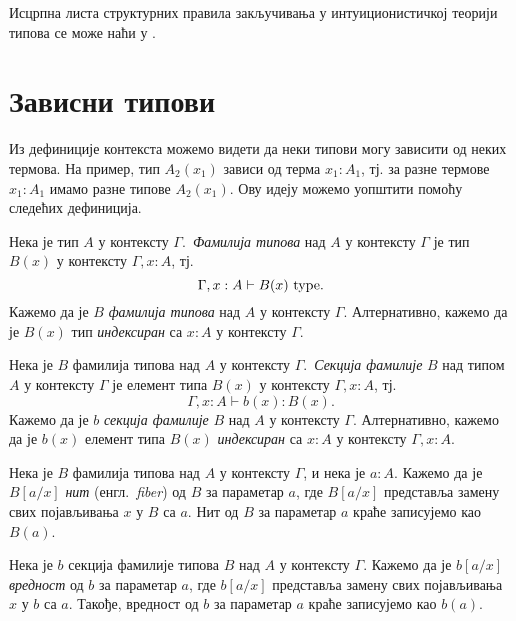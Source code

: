 \documentclass[12pt,oneside]{memoir}
\begin{document}
Исцрпна листа структурних правила закључивања у интуиционистичкој теорији типова се може наћи у \cite{rijke2022intro}.

\section{Зависни типови}

Из дефиниције контекста можемо видети да неки типови могу зависити од неких термова. На пример, тип $A_2(x_1)$ зависи од терма $x_1 : A_1$, тј. за разне термове $x_1 : A_1$ имамо разне типове $A_2(x_1)$. Ову идеју можемо уопштити помоћу следећих дефиниција.

\begin{definition}
    Нека је тип $A$ у контексту $\Gamma$.~\emph{Фамилија типова} над $A$ у контексту $\Gamma$ је тип $B(x)$ у контексту $\Gamma, x : A$, тј.
    \[\Gamma, x : A \vdash B(x)~{\mathrm{type}}.\]
    Кажемо да је $B$ \emph{фамилија типова} над $A$ у контексту $\Gamma$. Алтернативно, кажемо да је $B(x)$ тип \emph{индексиран} са $x : A$ у контексту $\Gamma$.
\end{definition}

\begin{definition}
    Нека је $B$ фамилија типова над $A$ у контексту $\Gamma$.~\emph{Секција фамилије} $B$ над типом $A$ у контексту $\Gamma$ је елемент типа $B(x)$ у контексту $\Gamma, x : A$, тј.
    \[\Gamma, x : A \vdash b(x) : B(x).\]
    Кажемо да је $b$ \emph{секција фамилије} $B$ над $A$ у контексту $\Gamma$. Алтернативно, кажемо да је $b(x)$ елемент типа $B(x)$ \emph{индексиран} са $x : A$ у контексту $\Gamma, x : A$. 
\end{definition}

\begin{definition}
    Нека је $B$ фамилија типова над $A$ у контексту $\Gamma$, и нека је $a : A$. Кажемо да је $B[a/x]$ \emph{нит} (енгл.~\emph{fiber}) од $B$ за параметар $a$, где $B[a/x]$ представља замену свих појављивања $x$ у $B$ са $a$. Нит од $B$ за параметар $a$ краће записујемо као $B(a)$.
\end{definition}

\begin{definition}
    Нека је $b$ секција фамилије типова $B$ над $A$ у контексту $\Gamma$. Кажемо да је $b[a/x]$ \emph{вредност} од $b$ за параметар $a$, где $b[a/x]$ представља замену свих појављивања $x$ у $b$ са $a$. Такође, вредност од $b$ за параметар $a$ краће записујемо као $b(a)$.
\end{definition}
\end{document}
